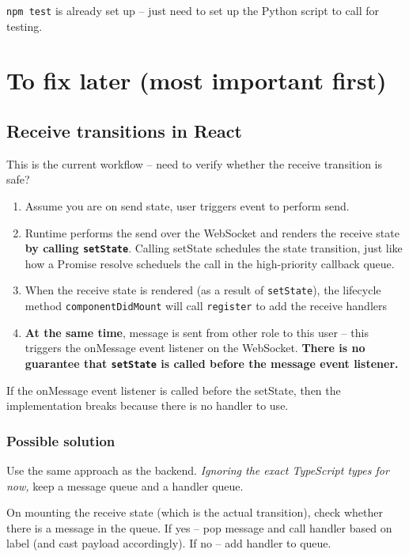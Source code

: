 \documentclass{article}
\begin{document}
\texttt{npm test} is already set up -- just need to
set up the Python script to call for testing.

\section{To fix later (most important first)}

\subsection*{Receive transitions in React}
This is the current workflow -- need to verify whether the receive transition is safe?

\begin{enumerate}
\item
Assume you are on send state, user triggers
event to perform send.
\item
Runtime performs the send over the WebSocket
and renders the receive state \textbf{by
calling \texttt{setState}}. Calling setState 
schedules the state transition, just like
how a Promise resolve scheduels the call in
the high-priority callback queue.

\item When the receive state is rendered (as a 
result of \texttt{setState}), the lifecycle
method \texttt{componentDidMount} will call \texttt{register} to add the receive handlers 

\item \textbf{At the same time}, message is sent from
other role to this user -- this triggers the 
onMessage event listener on the WebSocket. 
\textbf{There is no guarantee that \texttt{setState} 
is called before the message event listener.}

\end{enumerate}

If the onMessage event listener
is called before the setState,
then the implementation breaks because there is no
handler to use.

\subsubsection*{Possible solution}

Use the same approach as the backend.
\textit{Ignoring the exact TypeScript types for now,}
keep a message queue and a handler queue.

On mounting the receive state (which is the actual
transition), check whether there is a message in the 
queue.
If yes -- pop message and call handler based on label
(and cast payload accordingly).
If no -- add handler to queue.
\end{document}
